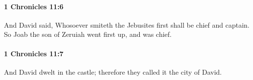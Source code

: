 		\paragraph{1 Chronicles 11:6} %
			\label{1CHRONICLES-11-6}

			And David said, Whosoever smiteth the Jebusites first shall be chief and captain. So Joab the son of Zeruiah went first up, and was chief.


		\paragraph{1 Chronicles 11:7} %
			\label{1CHRONICLES-11-7}

			And David dwelt in the castle; therefore they called it the city of David.



